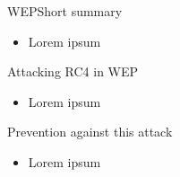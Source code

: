 \documentclass[
	aspectratio=169,	%
	onlytextwidth,		%
	t,					%
	]{beamer}
\begin{document}
\begin{frame}[fragile]{WEP}{Short summary}
	\begin{itemize}
		\item Lorem ipsum
	\end{itemize}
\end{frame}

\begin{frame}[fragile]{Attacking RC4 in WEP}
	\begin{itemize}
		\item Lorem ipsum
	\end{itemize}
\end{frame}

\begin{frame}[fragile]{Prevention against this attack}
	\begin{itemize}
		\item Lorem ipsum
	\end{itemize}
\end{frame}

\appendix
\makethankyou

\section{\appendixname}
\end{document}
